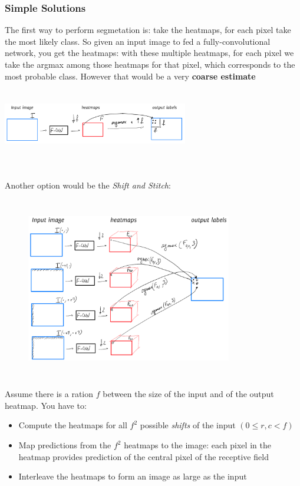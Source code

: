 \subsubsection{Simple Solutions}
The first way to perform segmetation is: take the heatmaps, for each pixel take the most likely class. So given an input image to fed a fully-convolutional network, you get the heatmaps: with these multiple heatmaps, for each pixel we take the argmax among those heatmaps for that pixel, which corresponds to the most probable class. However that would be a very \textbf{coarse estimate} \\

\begin{minipage}{\linewidth}
        \centering
        \includegraphics[width=8.1cm, height=3cm]{images/simple_solution_segm.png}
\end{minipage} \\


Another option would be the \textit{Shift and Stitch}: \\
\begin{figure}
    \includegraphics[width=9cm, height=8cm]{images/shift_stitch.png}
\end{figure}  
Assume there is a ration $f$ between the size of the input and of the output heatmap. You have to:
\begin{itemize}
    \item Compute the heatmaps for all $f^2$ possible \textit{shifts} of the input $\left( 0\leq r, c < f \right)$
    \item Map predictions from the $f^2$ heatmaps to the image: each pixel in the heatmap provides prediction of the central pixel of the receptive field
    \item Interleave the heatmaps to form an image as large as the input
\end{itemize}{}

